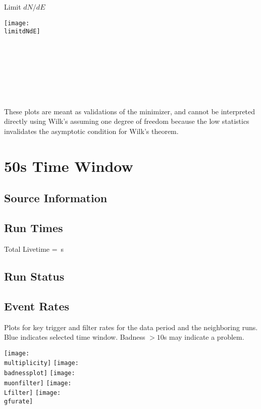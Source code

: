 \documentclass[titlepage]{article}
\begin{document}
\pagebreak
{
  \centering

  {\Large Limit $dN/dE$}

  \texttt{[image: \\limitdNdE]}
  \\
  \\

  \tsd

  \\
  \\
  \upperlim

  \\
  \\
  \nsscan

  These plots are meant as validations of the minimizer, and cannot be interpreted directly using Wilk's assuming one degree of freedom because the low statistics invalidates the asymptotic condition for Wilk's theorem.
}

\vfill

\pagebreak
\section{50s Time Window}

\subsection{Source Information}
\sourcetable

\subsection{Run Times}
\runtimetable

Total Livetime = \livetime\,s

\subsection{Run Status}
\runstatustable

\pagebreak
\subsection{Event Rates}
Plots for key trigger and filter rates for the data period
and the neighboring runs.  Blue indicates selected time window.
Badness $>10$s may indicate a problem.

\vspace{1em}
{
 \centering
 \texttt{[image: \\multiplicity]}
 \texttt{[image: \\badnessplot]}
 \texttt{[image: \\muonfilter]}
 \texttt{[image: \\Lfilter]}
 \texttt{[image: \\gfurate]}
}
\end{document}
